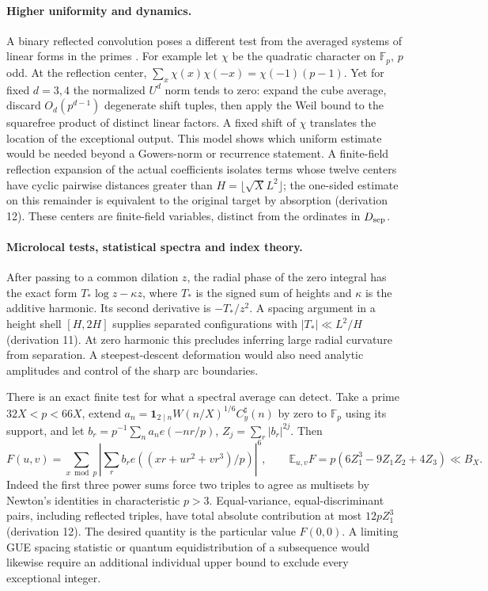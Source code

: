 \documentclass[11pt,a4paper]{article}
\newcommand{\F}{{\mathbb F}}\newcommand{\E}{{\mathbb E}}\newcommand{\ind}{\mathbf1}
\begin{document}
\paragraph{Higher uniformity and dynamics.}
A binary reflected convolution poses a different test from the averaged systems of linear forms in the primes \cite{GT}. For example let \(\chi\) be the quadratic character on \(\F_p\), \(p\) odd. At the reflection center, \(\sum_x\chi(x)\chi(-x)=\chi(-1)(p-1)\). Yet for fixed \(d=3,4\) the normalized \(U^d\) norm tends to zero: expand the cube average, discard \(O_d(p^{d-1})\) degenerate shift tuples, then apply the Weil bound to the squarefree product of distinct linear factors. A fixed shift of \(\chi\) translates the location of the exceptional output. This model shows which uniform estimate would be needed beyond a Gowers-norm or recurrence statement. A finite-field reflection expansion of the actual coefficients isolates terms whose twelve centers have cyclic pairwise distances greater than \(H=\lfloor\sqrt X L^2\rfloor\); the one-sided estimate on this remainder is equivalent to the original target by absorption (derivation 12). These centers are finite-field variables, distinct from the ordinates in \(D_{{\mathrm{sep}}}\).

\paragraph{Microlocal tests, statistical spectra and index theory.}
After passing to a common dilation \(z\), the radial phase of the zero integral has the exact form \(T_*\log z-\kappa z\), where \(T_*\) is the signed sum of heights and \(\kappa\) is the additive harmonic. Its second derivative is \(-T_*/z^2\). A spacing argument in a height shell \([H,2H]\) supplies separated configurations with \(|T_*|\ll L^2/H\) (derivation 11). At zero harmonic this precludes inferring large radial curvature from separation. A steepest-descent deformation would also need analytic amplitudes and control of the sharp arc boundaries.

There is an exact finite test for what a spectral average can detect. Take a prime \(32X<p<66X\), extend \(a_n=\ind_{2\mid n}W(n/X)^{1/6}C_y^\sharp(n)\) by zero to \(\F_p\) using its support, and let \(b_r=p^{-1}\sum_n a_ne(-nr/p)\), \(Z_j=\sum_r|b_r|^{2j}\). Then
\[
 F(u,v)=\sum_{x\bmod p}\left|\sum_r b_r e((xr+ur^2+vr^3)/p)\right|^6,\qquad
 \E_{u,v}F=p(6Z_1^3-9Z_1Z_2+4Z_3)\ll B_X .
\]
Indeed the first three power sums force two triples to agree as multisets by Newton's identities in characteristic \(p>3\). Equal-variance, equal-discriminant pairs, including reflected triples, have total absolute contribution at most \(12pZ_1^3\) (derivation 12). The desired quantity is the particular value \(F(0,0)\). A limiting GUE spacing statistic or quantum equidistribution of a subsequence would likewise require an additional individual upper bound to exclude every exceptional integer.
\end{document}
